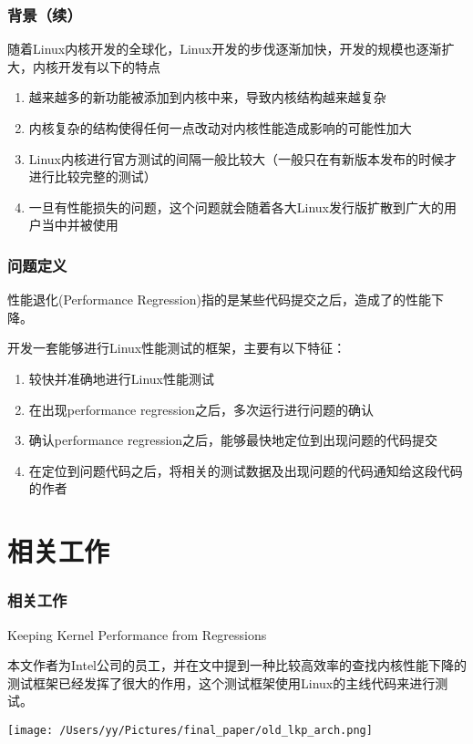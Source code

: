 \documentclass[xcolor=dvipsnames,11pt]{beamer}
\begin{document}
\begin{frame}
\frametitle{背景（续）}
随着Linux内核开发的全球化，Linux开发的步伐逐渐加快，开发的规模也逐渐扩大，内核开发有以下的特点
\begin{enumerate}
\item 越来越多的新功能被添加到内核中来，导致内核结构越来越复杂
\item 内核复杂的结构使得任何一点改动对内核性能造成影响的可能性加大
\item Linux内核进行官方测试的间隔一般比较大（一般只在有新版本发布的时候才进行比较完整的测试）
\item 一旦有性能损失的问题，这个问题就会随着各大Linux发行版扩散到广大的用户当中并被使用
\end{enumerate}


\end{frame}


\begin{frame}
\frametitle{问题定义}
性能退化(Performance Regression)指的是某些代码提交之后，造成了的性能下降。

开发一套能够进行Linux性能测试的框架，主要有以下特征：
\begin{enumerate}
\item 较快并准确地进行Linux性能测试
\item 在出现performance regression之后，多次运行进行问题的确认
\item 确认performance regression之后，能够最快地定位到出现问题的代码提交
\item 在定位到问题代码之后，将相关的测试数据及出现问题的代码通知给这段代码的作者
\end{enumerate}
\end{frame}


\section{相关工作}
\begin{frame}
\frametitle{相关工作}

\begin{block}{Keeping Kernel Performance from Regressions}
\begin{minipage}[b]{0.30\linewidth}
本文作者为Intel公司的员工，并在文中提到一种比较高效率的查找内核性能下降的测试框架已经发挥了很大的作用，这个测试框架使用Linux的主线代码来进行测试。
\end{minipage}
\begin{minipage}[b]{0.53\linewidth}
\texttt{[image: /Users/yy/Pictures/final\_paper/old\_lkp\_arch.png]}
\end{minipage}
\end{block}


\end{frame}
\end{document}
